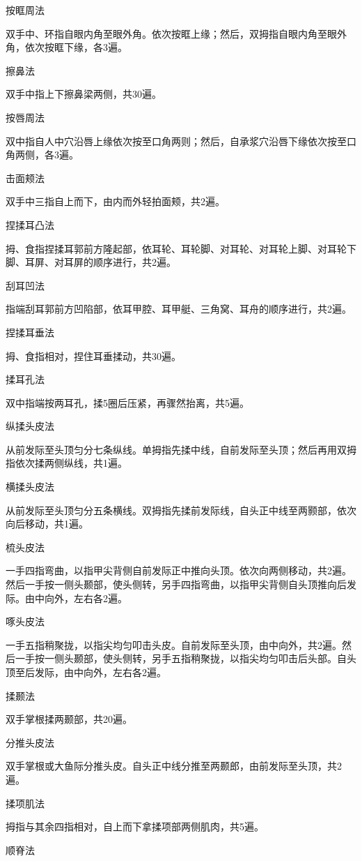 \documentclass[12pt,UTF8,openany]{ctexbook}
\begin{document}
按眶周法

双手中、环指自眼内角至眼外角。依次按眶上缘；然后，双拇指自眼内角至眼外角，依次按眶下缘，各3遍。

擦鼻法

双手中指上下擦鼻梁两侧，共30遍。

按唇周法

双中指自人中穴沿唇上缘依次按至口角两则；然后，自承浆穴沿唇下缘依次按至口角两侧，各3遍。

击面颊法

双手中三指自上而下，由内而外轻拍面颊，共2遍。

捏揉耳凸法

拇、食指捏揉耳郭前方隆起部，依耳轮、耳轮脚、对耳轮、对耳轮上脚、对耳轮下脚、耳屏、对耳屏的顺序进行，共2遍。

刮耳凹法

指端刮耳郭前方凹陷部，依耳甲腔、耳甲艇、三角窝、耳舟的顺序进行，共2遍。

捏揉耳垂法

拇、食指相对，捏住耳垂揉动，共30遍。

揉耳孔法

双中指端按两耳孔，揉5圈后压紧，再骤然抬离，共5遍。

纵揉头皮法

从前发际至头顶匀分七条纵线。单拇指先揉中线，自前发际至头顶；然后再用双拇指依次揉两侧纵线，共1遍。

横揉头皮法

从前发际至头顶匀分五条横线。双拇指先揉前发际线，自头正中线至两颢部，依次向后移动，共1遍。

梳头皮法

一手四指弯曲，以指甲尖背侧自前发际正中推向头顶。依次向两侧移动，共2遍。然后一手按一侧头颞部，使头侧转，另手四指弯曲，以指甲尖背侧自头顶推向后发际。由中向外，左右各2遍。

啄头皮法

一手五指稍聚拢，以指尖均匀叩击头皮。自前发际至头顶，由中向外，共2遍。然后一手按一侧头颞部，使头侧转，另手五指稍聚拢，以指尖均匀叩击后头部。自头顶至后发际，由中向外，左右各2遍。

揉颞法

双手掌根揉两颞部，共20遍。

分推头皮法

双手掌根或大鱼际分推头皮。自头正中线分推至两颞郎，由前发际至头顶，共2遍。

揉项肌法

拇指与其余四指相对，自上而下拿揉项部两侧肌肉，共5遍。

顺脊法
\end{document}
